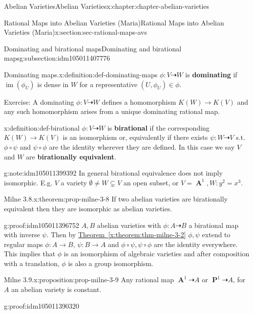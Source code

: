 \documentclass[oneside,10pt,]{book}
\newcommand{\terminology}[1]{\textbf{#1}}
\numberwithin{equation}{section}
\DeclareMathOperator{\im}{im}
\DeclareMathOperator{\aff}{\mathbf{A}}
\DeclareMathOperator{\PP}{\mathbf{P}}
\begin{document}
\begin{chapterptx}{Abelian Varieties}{}{Abelian Varieties}{}{}{x:chapter:chapter-abelian-varieties}
\begin{sectionptx}{Rational Maps into Abelian Varieties (Maria)}{}{Rational Maps into Abelian Varieties (Maria)}{}{}{x:section:sec-rational-maps-avs}
\begin{subsectionptx}{Dominating and birational maps}{}{Dominating and birational maps}{}{}{g:subsection:idm105011407776}
\begin{definition}{Dominating maps.}{x:definition:def-dominating-maps}%
\(\phi\colon V \dashrightarrow W\) is \terminology{dominating} if \(\im (\phi_U)\) is dense in \(W\) for a representative \((U,\phi_U)\in \phi\).%
\end{definition}
Exercise: A dominating \(\phi\colon V\dashrightarrow W\) defines a homomorphism \(K(W) \to K(V)\) and any such homomorphism arises from a unique dominating rational map.%
\begin{definition}{}{x:definition:def-birational}%
\(\phi\colon V \dashrightarrow W\) is \terminology{birational} if the corresponding \(K(W)\to K(V)\) is an isomorphism or, equivalently if there exists \(\psi\colon W\dashrightarrow V \) s.t. \(\phi\circ \psi\) and \(\psi\circ\phi\) are the identity wherever they are defined. In this case we say \(V\) and \(W\) are \terminology{birationally equivalent}.%
\end{definition}
\begin{note}{}{g:note:idm105011399392}%
In general birational equivalence does not imply isomorphic. E.g. \(V\) a variety \(\emptyset \ne W\subsetneq V\) an open subset, or \(V= \aff^1, W \colon y^2 =x^3\).%
\end{note}
\begin{theorem}{Milne 3.8.}{}{x:theorem:prop-milne-3-8}%
If two abelian varieties are birationally equivalent then they are isomorphic as abelian varieties.%
\end{theorem}
\begin{proofptx}{}{g:proof:idm105011396752}
\(A,B\) abelian varieties with \(\phi \colon A\dashrightarrow B\) a birational map with inverse \(\psi\). Then by \hyperref[x:theorem:thm-milne-3-2]{Theorem~\ref{x:theorem:thm-milne-3-2}} \(\phi ,\psi\) extend to regular maps   \(\phi\colon A \to B \), \(\psi\colon B\to A\) and \(\phi\circ\psi,\psi\circ\phi\) are  the identity everywhere. This implies that \(\phi\) is an isomorphism of  algebraic varieties and after composition with a translation, \(\phi\) is also a group isomorphism.%
\end{proofptx}
\begin{proposition}{Milne 3.9.}{}{x:proposition:prop-milne-3-9}%
Any rational map \(\aff^1 \dashrightarrow A\) or \(\PP^1 \dashrightarrow A\), for \(A\) an abelian variety is constant.%
\end{proposition}
\begin{proofptx}{}{g:proof:idm105011390320}

\end{proofptx}
\end{subsectionptx}
\end{sectionptx}
\end{chapterptx}
\end{document}
